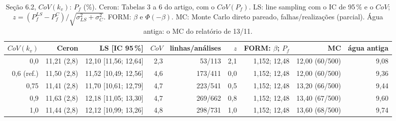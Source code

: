 \begin{table}[htbp]\centering\scriptsize\setlength{\tabcolsep}{3pt}
\caption{Seção 6.2, $CoV(k_v)$: $P_f$ (\%). Ceron: Tabelas 3 a 6 do artigo, com o $CoV(P_f)$. LS: line sampling com o IC de 95\,\% e o $CoV$; $z = (P_f^{LS} - P_f^{C})/\sqrt{\sigma_{LS}^2 + \sigma_C^2}$. FORM: $\beta$ e $\Phi(-\beta)$. MC: Monte Carlo direto pareado, falhas/realizações (parcial). Água antiga: o MC do relatório de 13/11.}\label{tab:pf_covk}
\begin{tabular}{rrrrrrrrr}\toprule
$CoV(k_v)$ & Ceron & LS [IC 95\,\%] & $CoV$ & linhas/análises & $z$ & FORM: $\beta$; $P_f$ & MC & água antiga \\\midrule
0{,}0 & 11{,}21 (2{,}8) & 12{,}10 [11{,}56; 12{,}64] & 2{,}3 & 53/113 & 2{,}1 & 1{,}152; 12{,}48 & 12{,}00 (60/500) & 9{,}08 \\
0{,}6 (ref.) & 11{,}50 (2{,}8) & 11{,}52 [10{,}49; 12{,}56] & 4{,}6 & 173/411 & 0{,}0 & 1{,}152; 12{,}48 & 12{,}00 (60/500) & 9{,}36 \\
0{,}75 & 11{,}41 (2{,}8) & 11{,}70 [10{,}61; 12{,}79] & 4{,}7 & 223/541 & 0{,}5 & 1{,}152; 12{,}48 & 13{,}20 (66/500) & 9{,}44 \\
0{,}9 & 11{,}63 (2{,}8) & 12{,}18 [11{,}05; 13{,}30] & 4{,}7 & 269/662 & 0{,}8 & 1{,}152; 12{,}48 & 13{,}40 (67/500) & 9{,}60 \\
1{,}0 & 11{,}44 (2{,}8) & 12{,}12 [10{,}99; 13{,}26] & 4{,}8 & 298/731 & 1{,}0 & 1{,}152; 12{,}48 & 13{,}60 (68/500) & 9{,}74 \\
\bottomrule\end{tabular}\end{table}
